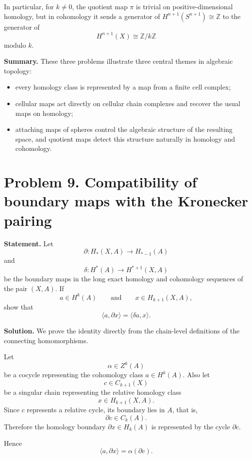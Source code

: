 \documentclass[12pt,a4paper]{article}
\theoremstyle{notespace}
\begin{document}
\medskip

In particular, for \(k\neq 0\), the quotient map \(\pi\) is trivial on positive-dimensional homology, but in cohomology it sends a generator of \(H^{n+1}(S^{n+1})\cong \mathbb Z\) to the generator of
\[
H^{n+1}(X)\cong \mathbb Z/k\mathbb Z
\]
modulo \(k\).

\bigskip

\noindent
\textbf{Summary.}
These three problems illustrate three central themes in algebraic topology:

\begin{itemize}
	\item every homology class is represented by a map from a finite cell complex;
	\item cellular maps act directly on cellular chain complexes and recover the usual maps on homology;
	\item attaching maps of spheres control the algebraic structure of the resulting space, and quotient maps detect this structure naturally in homology and cohomology.
\end{itemize}

\section{Problem 9. Compatibility of boundary maps with the Kronecker pairing}

\textbf{Statement.}
Let
\[
\partial : H_*(X,A)\longrightarrow H_{*-1}(A)
\]
and
\[
\delta : H^*(A)\longrightarrow H^{*+1}(X,A)
\]
be the boundary maps in the long exact homology and cohomology sequences of the pair \((X,A)\). If
\[
a\in H^k(A)
\qquad\text{and}\qquad
x\in H_{k+1}(X,A),
\]
show that
\[
\langle a,\partial x\rangle=\langle \delta a,x\rangle .
\]

\medskip

\textbf{Solution.}
We prove the identity directly from the chain-level definitions of the connecting homomorphisms.

Let
\[
\alpha\in Z^k(A)
\]
be a cocycle representing the cohomology class \(a\in H^k(A)\). Also let
\[
c\in C_{k+1}(X)
\]
be a singular chain representing the relative homology class
\[
x\in H_{k+1}(X,A).
\]
Since \(c\) represents a relative cycle, its boundary lies in \(A\), that is,
\[
\partial c\in C_k(A).
\]
Therefore the homology boundary \(\partial x\in H_k(A)\) is represented by the cycle \(\partial c\).

Hence
\[
\langle a,\partial x\rangle
=
\alpha(\partial c).
\]
\end{document}
